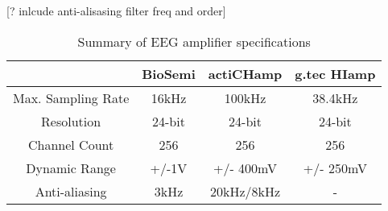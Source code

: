 \begin{table}[]
\centering
\caption{Summary of EEG amplifier specifications} [? inlcude anti-alisasing filter freq and order]
\label{tableeeg}
\begin{tabular}{|c|c|c|c|}
\hline
\textbf{}          & \textbf{BioSemi} & \textbf{actiCHamp} & \textbf{g.tec HIamp} \\ \hline
Max. Sampling Rate & 16kHz            & 100kHz             & 38.4kHz              \\ \hline
Resolution         & 24-bit           & 24-bit             & 24-bit               \\ \hline
Channel Count      & 256              & 256                & 256                  \\ \hline
Dynamic Range      & +/-1V            & +/- 400mV          & +/- 250mV            \\ \hline
Anti-aliasing      & 3kHz             & 20kHz/8kHz         &  -                   \\ \hline
\end{tabular}
\end{table}